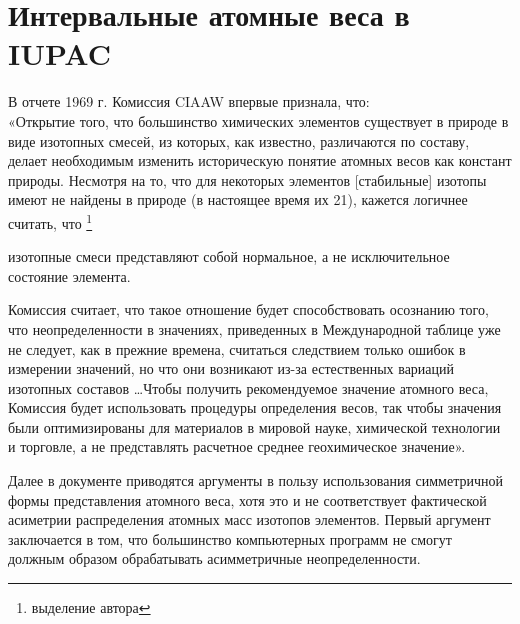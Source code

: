 \documentclass[a5paper,openany]{book}
\begin{document}
\section{Интервальные атомные веса в IUPAC}



В отчете 1969 г. \cite{AtomicWeights1969} Комиссия CIAAW впервые признала, что:\\
«Открытие того, что большинство химических элементов существует в природе в виде изотопных смесей,
из которых, как известно, различаются по составу, делает необходимым изменить историческую
понятие атомных весов как констант природы. Несмотря на то, что для некоторых элементов  [стабильные] изотопы имеют не найдены в природе (в настоящее время их 21), кажется логичнее считать, что \footnote{выделение автора}
\begin{center}
	изотопные смеси представляют собой нормальное, а не
	исключительное состояние элемента. 
\end{center} 

Комиссия считает, что такое отношение будет
способствовать осознанию того, что неопределенности в значениях, приведенных в Международной таблице
уже не следует, как в прежние времена, считаться следствием только ошибок в
измерении значений, но что они возникают из-за естественных вариаций изотопных
составов \ldots Чтобы получить рекомендуемое значение атомного веса,
Комиссия будет использовать процедуры определения весов, так чтобы значения были оптимизированы для
материалов в мировой науке, химической технологии и торговле, а не представлять расчетное среднее геохимическое значение».

Далее в документе \cite{AtomicWeights1969} приводятся аргументы в пользу использования симметричной формы представления атомного веса, хотя это и не соответствует фактической асиметрии распределения атомных масс изотопов элементов. Первый аргумент заключается в том, что большинство
компьютерных программ не смогут должным образом обрабатывать асимметричные неопределенности.
\end{document}
